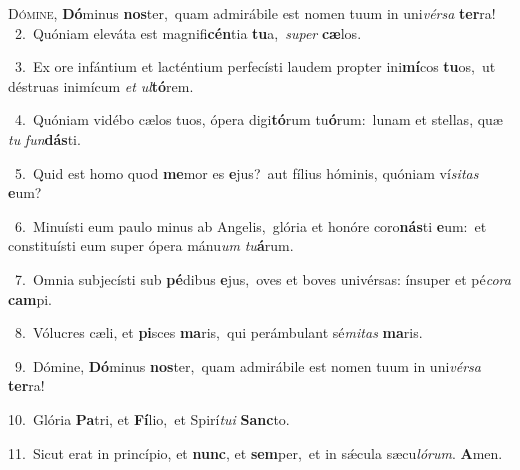 \lettrine{\initial\textcolor{\initialcolor}{D}}{ómine,} \textbf{Dó}\-minus \textbf{nos}\-ter,~\star quam admirábile est nomen tuum in uni\-\textit{vér}\-\textit{sa} \textbf{ter}\-ra!\\
{\numbfont\textcolor{\numbcolor}{~2.}}~Quóniam eleváta est magnifi\-\textbf{cén}\-tia \textbf{tu}\-a,~\star \textit{su}\-\textit{per} \textbf{cæ}\-los.\par
{\numbfont\textcolor{\numbcolor}{~3.}}~Ex ore infántium et lacténtium perfecísti laudem propter ini\-\textbf{mí}\-cos \textbf{tu}\-os,~\star ut déstruas inimícum \textit{et} \textit{ul}\-\textbf{tó}rem.\par
{\numbfont\textcolor{\numbcolor}{~4.}}~Quóniam vidébo cælos tuos, ópera digi\-\textbf{tó}\-rum tu\-\textbf{ó}\-rum:~\star lunam et stellas, quæ \textit{tu} \textit{fun}\-\textbf{dás}ti.\par
{\numbfont\textcolor{\numbcolor}{~5.}}~Quid est homo quod \textbf{me}\-mor es \textbf{e}\-jus?~\star aut fílius hóminis, quóniam ví\-\textit{si}\-\textit{tas} \textbf{e}\-um?\par
{\numbfont\textcolor{\numbcolor}{~6.}}~Minuísti eum paulo minus ab Angelis,~\dagger glória et honóre coro\-\textbf{nás}\-ti \textbf{e}\-um:~\star et constituísti eum super ópera mánu\textit{um} \textit{tu}\-\textbf{á}rum.\par
{\numbfont\textcolor{\numbcolor}{~7.}}~Omnia subjecísti sub \textbf{pé}\-dibus \textbf{e}\-jus,~\star oves et boves univérsas: ínsuper et pé\-\textit{co}\-\textit{ra} \textbf{cam}\-pi.\par
{\numbfont\textcolor{\numbcolor}{~8.}}~Vólucres cæli, et \textbf{pi}\-sces \textbf{ma}\-ris,~\star qui perámbulant sé\-\textit{mi}\-\textit{tas} \textbf{ma}\-ris.\par
{\numbfont\textcolor{\numbcolor}{~9.}}~Dómine, \textbf{Dó}\-minus \textbf{nos}\-ter,~\star quam admirábile est nomen tuum in uni\-\textit{vér}\-\textit{sa} \textbf{ter}\-ra!\par
{\numbfont\textcolor{\numbcolor}{10.}}~Glória \textbf{Pa}\-tri, et \textbf{Fí}\-lio,~\star et Spirí\-\textit{tu}\-\textit{i} \textbf{Sanc}\-to.\par
{\numbfont\textcolor{\numbcolor}{11.}}~Sicut erat in princípio, et \textbf{nunc}\-, et \textbf{sem}\-per,~\star et in sǽcula sæcu\-\textit{ló}\-\textit{rum}. \textbf{A}\-men.\par
